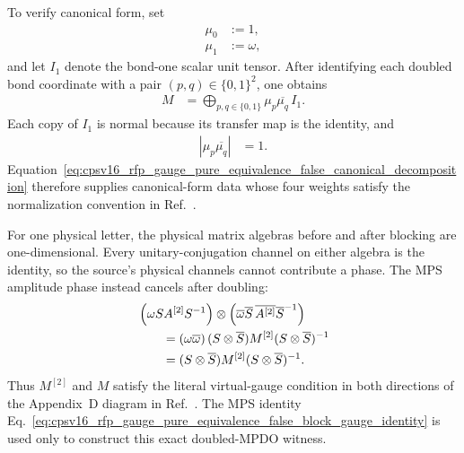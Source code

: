 \documentclass{article}
\begin{document}
To verify canonical form, set
\begin{align}
    \mu_0 &:= 1,
    \label{eq:cpsv16_rfp_gauge_pure_equivalence_false_first_weight}\\
    \mu_1 &:= \omega,
    \label{eq:cpsv16_rfp_gauge_pure_equivalence_false_second_weight}
\end{align}
and let $I_1$ denote the bond-one scalar unit tensor. After identifying each
doubled bond coordinate with a pair $(p,q)\in\{0,1\}^2$, one obtains
\begin{align}
    M
        &=
        \bigoplus_{p,q\in\{0,1\}}
        \mu_p\overline{\mu_q}\,I_1.
    \label{eq:cpsv16_rfp_gauge_pure_equivalence_false_canonical_decomposition}
\end{align}
Each copy of $I_1$ is normal because its transfer map is the identity, and
\begin{align}
    \left|\mu_p\overline{\mu_q}\right|
        &= 1.
    \label{eq:cpsv16_rfp_gauge_pure_equivalence_false_weight_normalization}
\end{align}
Equation~\ref{eq:cpsv16_rfp_gauge_pure_equivalence_false_canonical_decomposition}
therefore supplies canonical-form data whose four weights satisfy the
normalization convention in Ref.~\cite{Cirac2016MPDO_arXiv}.

For one physical letter, the physical matrix algebras before and after
blocking are one-dimensional. Every unitary-conjugation channel on either
algebra is the identity, so the source's physical channels cannot contribute a
phase. The MPS amplitude phase instead cancels after doubling:
\begin{align}
    &\left(\omega S A^{[2]}S^{-1}\right)
    \otimes
    \left(\overline\omega
        \overline S\,\overline{A^{[2]}} \overline S^{-1}\right)
    \notag\\
    &\qquad=
    \left(\omega\overline\omega\right)
    (S\otimes\overline S)
    M^{[2]}
    (S\otimes\overline S)^{-1}
    \label{eq:cpsv16_rfp_gauge_pure_equivalence_false_phase_cancellation}\\
    &\qquad=
    (S\otimes\overline S)
    M^{[2]}
    (S\otimes\overline S)^{-1}.
    \label{eq:cpsv16_rfp_gauge_pure_equivalence_false_doubled_gauge_identity}
\end{align}
Thus $M^{[2]}$ and $M$ satisfy the literal virtual-gauge condition in both
directions of the Appendix~D diagram in
Ref.~\cite{Cirac2016MPDO_arXiv}. The MPS identity
Eq.~\ref{eq:cpsv16_rfp_gauge_pure_equivalence_false_block_gauge_identity} is
used only to construct this exact doubled-MPDO witness.
\end{document}
